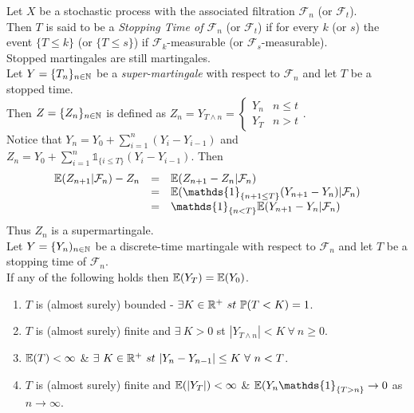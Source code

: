 \documentclass[11pt,a4paper]{article}
\begin{document}
Let $X$ be a stochastic process with the associated filtration $\mathcal{F}_n$ (or $\mathcal{F}_t$).\\
Then $T$ is said to be a \textit{Stopping Time of $\mathcal{F}_n$} (or $\mathcal{F}_t$) if for every $k$ (or $s$) the event $\{T\leq k\}$ (or $\{T\leq s\}$) if $\mathcal{F}_k$-measurable (or $\mathcal{F}_s$-measurable).\\
\nb Stopped martingales are still martingales.\\

Let $Y=\{T_n\}_{n\in\mathbb{N}}$ be a \textit{super-martingale} with respect to $\mathcal{F}_n$ and let $T$ be a stopped time.\\
Then $Z=\{Z_n\}_{n\in\mathbb{N}}$ is defined as $Z_n=Y_{T\wedge n}=\begin{cases}Y_n&n\leq t\\Y_T&n>t\end{cases}$.\\

Notice that $Y_n=Y_0+\sum_{i=1}^n(Y_i-Y_{i-1})$ and $Z_n=Y_0+\sum_{i=1}^n\mathds{1}_{\{i\leq T\}}(Y_i-Y_{i-1})$. Then
\[\begin{array}{rcl}
\expect(Z_{n+1}|\mathcal{F}_n)-Z_n&=&\expect(Z_{n+1}-Z_n|\mathcal{F}_n)\\
&=&\expect(\mathds{1}_{\{n+1\leq T\}}(Y_{n+1}-Y_n)|\mathcal{F}_n)\\
&=&\mathds{1}_{\{n<T\}}\expect(Y_{n+1}-Y_n|\mathcal{F}_n)
\end{array}\]
Thus $Z_n$ is a supermartingale.\\

Let $Y=\{Y_n)_{n\in\mathbb{N}}$ be a discrete-time martingale with respect to $\mathcal{F}_n$ and let $T$ be a stopping time of $\mathcal{F}_n$.\\
If any of the following holds then $\mathbb{E}(Y_T)=\mathbb{E}(Y_0)$.
\begin{enumerate}[label=\roman*)]
	\item $T$ is (almost surely) bounded - $\exists K\in\mathbb{R}^+\ st\ \mathbb{P}(T<K)=1$.
	\item $T$ is (almost surely) finite and $\exists\ K>0$ st $|Y_{T\wedge n}|<K\ \forall\ n\geq0$.
	\item $\mathbb{E}(T)<\infty$ \& $\exists\ K\in\mathbb{R}^+\ st\ |Y_n-Y_{n-1}|\leq K\ \forall\ n<T$.
	\item $T$ is (almost surely) finite and $\mathbb{E}(|Y_T|)<\infty$ \& $\expect(Y_n\mathds{1}_{\{T>n\}}\to0$ as $n\to\infty$.
\end{enumerate}
\end{document}
